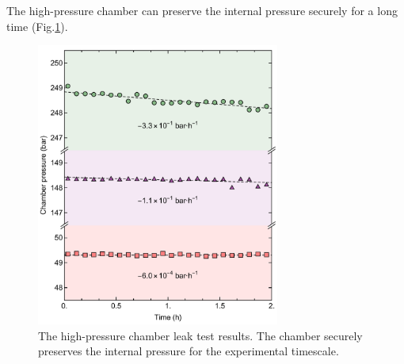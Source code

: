 The high-pressure chamber can preserve the internal pressure securely for a long time (Fig.\ref{fig:leak}).

\begin{figure}[h!]
\centering
\includegraphics[width=80mm]{figures/ap2/leak/leak.pdf}
\caption{The high-pressure chamber leak test results. The chamber securely preserves the internal pressure for the experimental timescale.}
\label{fig:leak}
\end{figure}
